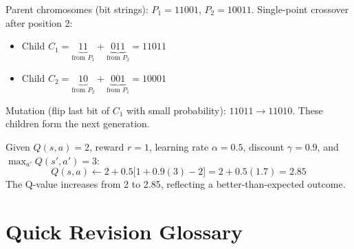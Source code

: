 \documentclass[11pt,a4paper]{article}
\begin{document}
\begin{examplebox}
Parent chromosomes (bit strings): $P_1=11001$, $P_2=10011$. Single-point crossover after position 2:
\begin{itemize}[leftmargin=*]
  \item Child $C_1 = \underbrace{11}_{\text{from }P_1} + \underbrace{011}_{\text{from }P_2} = 11011$
  \item Child $C_2 = \underbrace{10}_{\text{from }P_2} + \underbrace{001}_{\text{from }P_1} = 10001$
\end{itemize}
Mutation (flip last bit of $C_1$ with small probability): $11011 \to 11010$. These children form the next generation.
\end{examplebox}

\begin{examplebox}
Given $Q(s,a)=2$, reward $r=1$, learning rate $\alpha=0.5$, discount $\gamma=0.9$, and $\max_{a'}Q(s',a')=3$:
$$
Q(s,a) \leftarrow 2 + 0.5\big[1 + 0.9(3) - 2\big] = 2 + 0.5(1.7) = 2.85
$$
The Q-value increases from 2 to 2.85, reflecting a better-than-expected outcome.
\end{examplebox}

\section{Quick Revision Glossary}
\end{document}
